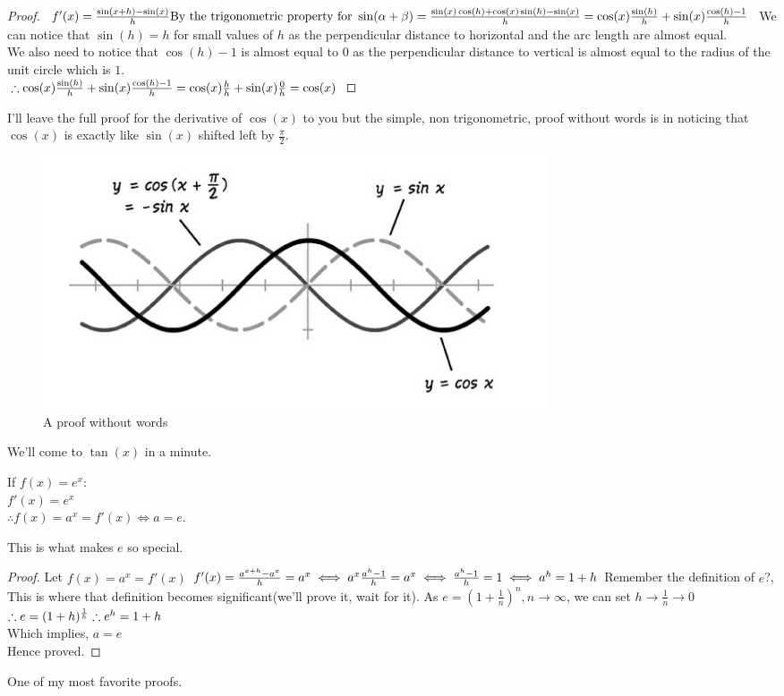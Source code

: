 \begin{proof}
    $f'(x)=\frac{\sin(x+h)-\sin(x)}{h} \text{By the trigonometric property for } \sin(\alpha+\beta)\\
    = \frac{\sin(x)\cos(h)+\cos(x)\sin(h)-\sin(x)}{h}\\
    = \cos(x)\frac{\sin(h)}{h}+\sin(x)\frac{\cos(h)-1}{h}$
    We can notice that $\sin(h)=h$ for small values of $h$ as the perpendicular distance to horizontal and the arc length are almost equal.\\
    We also need to notice that $\cos(h)-1$ is almost equal to $0$ as the perpendicular distance to vertical is almost equal to the radius of the unit circle which is $1$.\\
    $\therefore \cos(x)\frac{\sin(h)}{h}+\sin(x)\frac{\cos(h)-1}{h}\\
    = \cos(x)\frac{h}{h}+\sin(x)\frac{0}{h}
    = \cos(x)$
\end{proof}
I'll leave the full proof for the derivative of $\cos(x)$ to you but the simple, non trigonometric, proof without words is in noticing that $\cos(x)$ is exactly like $\sin(x)$ shifted left by $\frac{\pi}{2}$.\\
\begin{figure} [h]
    \centering
    \includegraphics[width=0.5\linewidth]{Photos/Cos derivative proof without words.png}
    \caption{A proof without words}
    
\end{figure}
We'll come to $\tan(x)$ in a minute.
\begin{theorem}
    If $f(x)=e^x$:\\
    $f'(x)=e^x$\\
    $\therefore f(x)=a^x=f'(x) \iff a=e$.
\end{theorem}
This is what makes $e$ so special.
\begin{proof}
Let $f(x)=a^x=f'(x)$
    $f'(x)=\frac{a^{x+h}-a^x}{h}=a^x\\
    \iff a^x\frac{a^h-1}{h}=a^x\\
    \iff \frac{a^h-1}{h}=1\\
    \iff a^h=1+h$
    Remember the definition of $e$?, This is where that definition becomes significant(we'll prove it, wait for it). As $e=(1+\frac{1}{n})^n, n \rightarrow \infty$, we can set $h \rightarrow \frac{1}{n} \rightarrow 0$\\
    $\therefore e=(1+h)^{\frac{1}{h}}\\
    \therefore e^h=1+h$\\
    Which implies, $a=e$\\
    Hence proved.
\end{proof}
One of my most favorite proofs.
